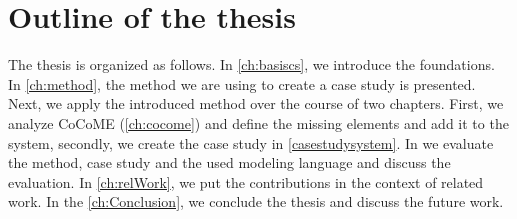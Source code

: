 \section{Outline of the thesis}
The thesis is organized as follows. In \autoref{ch:basiscs}, we introduce the foundations. In \autoref{ch:method}, the method we are using to create a case study is presented. Next, we apply the introduced method over the course of two chapters. First, we analyze CoCoME (\autoref{ch:cocome}) and define the missing elements and add it to the system, secondly, we create the case study in \autoref{casestudysystem}. In  we evaluate the method, case study and the used modeling language and discuss the evaluation. In \autoref{ch:relWork}, we put the contributions in the context of related work. In the \autoref{ch:Conclusion}, we conclude the thesis and discuss the future work.